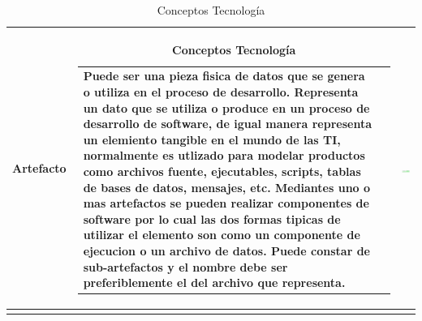 \begin{longtable}{|c|c|c|}
	Artefacto
	&
	\begin{tabular}{p{8cm}p{3cm}} 
		Puede ser una pieza fisica de datos que se genera o utiliza en el proceso de desarrollo.
		Representa un dato que se utiliza o produce en un proceso de desarrollo de software, de igual manera representa un elemiento tangible en el mundo de las TI, normalmente es utlizado para modelar productos como archivos fuente, ejecutables, scripts, tablas de bases de datos, mensajes, etc.
		Mediantes uno o mas artefactos se pueden realizar componentes de software por lo cual las dos formas tipicas de utilizar el elemento son como un componente de ejecucion o un archivo de datos. Puede constar de sub-artefactos y el nombre debe ser preferiblemente el del archivo que representa.
		
	\end{tabular}
	& \includegraphics[width=0.2\linewidth, height=0.05\textheight]{imgs/conceptos/tecnologica/artefacto}
	\\
	
	\hline
			\caption{Conceptos Tecnología}
\end{longtable}